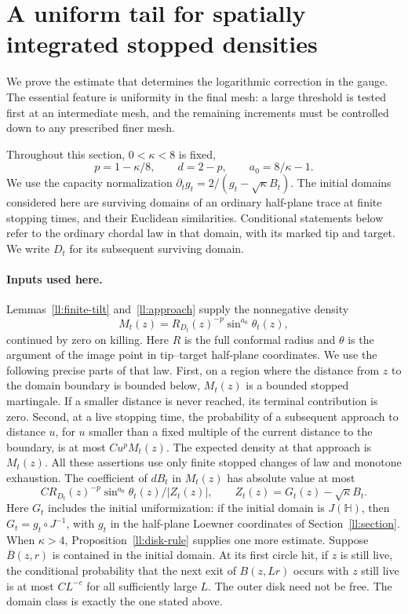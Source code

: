 \section{A uniform tail for spatially integrated stopped densities}
\label{mesh:section}

We prove the estimate that determines the logarithmic correction in the
gauge.  The essential feature is uniformity in the final mesh: a large
threshold is tested first at an intermediate mesh, and the remaining
increments must be controlled down to any prescribed finer mesh.

Throughout this section, $0<\kappa<8$ is fixed,
\[
 p=1-\kappa/8,\qquad d=2-p,\qquad a_0=8/\kappa-1.
\]
We use the capacity normalization
$\partial_tg_t=2/(g_t-\sqrt\kappa B_t)$.  The initial domains considered
here are surviving domains of an ordinary half-plane trace at finite
stopping times, and their Euclidean similarities.  Conditional statements below refer
to the ordinary chordal law in that domain, with its marked tip and
target.  We write $D_t$ for its subsequent surviving domain.

\paragraph{Inputs used here.}
Lemmas~\ref{ll:finite-tilt} and~\ref{ll:approach} supply the nonnegative density
\[
 M_t(z)=R_{D_t}(z)^{-p}\sin^{a_0}\theta_t(z),
\]
continued by zero on killing.  Here $R$ is the full conformal radius and
$\theta$ is the argument of the image point in tip--target half-plane
coordinates.  We use the following precise parts of that law.
First, on a region where the distance from $z$ to the domain boundary is
bounded below, $M_t(z)$ is a bounded stopped martingale.  If a smaller
distance is never reached, its terminal contribution is zero.  Second,
at a live stopping time, the probability of a subsequent approach to
distance $u$, for $u$ smaller than a fixed multiple of the current
distance to the boundary, is at most $C u^pM_t(z)$.  The expected density
at that approach is $M_t(z)$.  All these assertions use only finite
stopped changes of law and monotone exhaustion.  The coefficient of
$dB_t$ in $M_t(z)$ has absolute value at most
\begin{equation}
 C R_{D_t}(z)^{-p}\sin^{a_0}\theta_t(z)/|Z_t(z)|,
 \qquad Z_t(z)=G_t(z)-\sqrt\kappa B_t.
 \label{mesh:coefficient-input}
\end{equation}
Here $G_t$ includes the initial uniformization: if the initial domain
is $J(\mathbb H)$, then $G_t=g_t\circ J^{-1}$, with $g_t$ in the
half-plane Loewner coordinates of Section~\ref{ll:section}.
When $\kappa>4$, Proposition~\ref{ll:disk-rule} supplies one more
estimate.  Suppose $\overline B(z,r)$ is contained in the initial
domain.  At its first circle hit, if $z$ is still live, the conditional
probability that the next exit of $B(z,Lr)$ occurs with $z$ still live
is at most $CL^{-c}$ for all sufficiently large $L$.  The outer disk need
not be free.  The domain class is exactly the one stated above.

